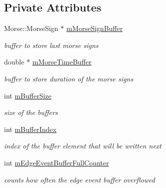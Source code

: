 \subsection*{Private Attributes}
\begin{DoxyCompactItemize}
\item 
\mbox{\label{classMorseStatistic_ac778af78c64cc2a700e09dc78dc300a7}} 
Morse\+::\+Morse\+Sign $\ast$ \hyperlink{classMorseStatistic_ac778af78c64cc2a700e09dc78dc300a7}{m\+Morse\+Sign\+Buffer}
\begin{DoxyCompactList}\small\item\em buffer to store last morse signs \end{DoxyCompactList}\item 
\mbox{\label{classMorseStatistic_a376ed110e487f81bf51547e28c366d34}} 
double $\ast$ \hyperlink{classMorseStatistic_a376ed110e487f81bf51547e28c366d34}{m\+Morse\+Time\+Buffer}
\begin{DoxyCompactList}\small\item\em buffer to store duration of the morse signs \end{DoxyCompactList}\item 
\mbox{\label{classMorseStatistic_a1c05e54ba3bbdf68153cba828bfc019f}} 
int \hyperlink{classMorseStatistic_a1c05e54ba3bbdf68153cba828bfc019f}{m\+Buffer\+Size}
\begin{DoxyCompactList}\small\item\em size of the buffers \end{DoxyCompactList}\item 
\mbox{\label{classMorseStatistic_acf145c45629cca3568ec7d69c94ccce2}} 
int \hyperlink{classMorseStatistic_acf145c45629cca3568ec7d69c94ccce2}{m\+Buffer\+Index}
\begin{DoxyCompactList}\small\item\em index of the buffer element that will be written next \end{DoxyCompactList}\item 
\mbox{\label{classMorseStatistic_a60c80a05c589975e44063a02bbf9b933}} 
int \hyperlink{classMorseStatistic_a60c80a05c589975e44063a02bbf9b933}{m\+Edge\+Event\+Buffer\+Full\+Counter}
\begin{DoxyCompactList}\small\item\em counts how often the edge event buffer overflowed \end{DoxyCompactList}\item 

\end{DoxyCompactItemize}
